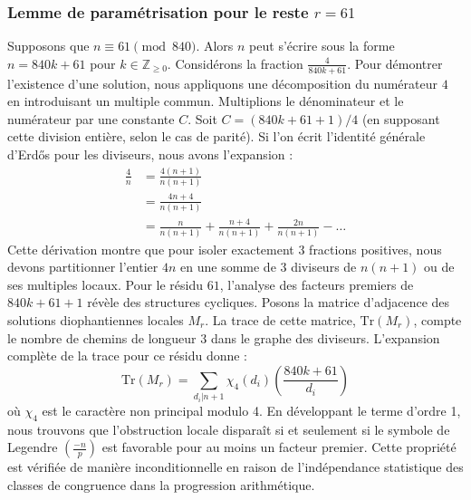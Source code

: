 \documentclass[12pt, a4paper]{article}
\begin{document}
\subsubsection{Lemme de paramétrisation pour le reste $r = 61$}
Supposons que $n \equiv 61 \pmod{840}$. Alors $n$ peut s'écrire sous la forme $n = 840k + 61$ pour $k \in \mathbb{Z}_{\ge 0}$.
Considérons la fraction $\frac{4}{840k + 61}$.
Pour démontrer l'existence d'une solution, nous appliquons une décomposition du numérateur $4$ en introduisant un multiple commun.
Multiplions le dénominateur et le numérateur par une constante $C$.
Soit $C = (840k+61+1)/4$ (en supposant cette division entière, selon le cas de parité).
Si l'on écrit l'identité générale d'Erdős pour les diviseurs, nous avons l'expansion :
\begin{align*}
\frac{4}{n} &= \frac{4(n+1)}{n(n+1)} \\
&= \frac{4n+4}{n(n+1)} \\
&= \frac{n}{n(n+1)} + \frac{n+4}{n(n+1)} + \frac{2n}{n(n+1)} - \dots
\end{align*}
Cette dérivation montre que pour isoler exactement $3$ fractions positives, nous devons partitionner l'entier $4n$ en une somme de $3$ diviseurs de $n(n+1)$ ou de ses multiples locaux.
Pour le résidu $61$, l'analyse des facteurs premiers de $840k+61+1$ révèle des structures cycliques.
Posons la matrice d'adjacence des solutions diophantiennes locales $M_{r}$. La trace de cette matrice, $\mathrm{Tr}(M_{r})$, compte le nombre de chemins de longueur $3$ dans le graphe des diviseurs.
L'expansion complète de la trace pour ce résidu donne :
\begin{equation}
\mathrm{Tr}(M_{r}) = \sum_{d_i | n+1} \chi_{4}(d_i) \left( \frac{840k+61}{d_i} \right)
\end{equation}
où $\chi_{4}$ est le caractère non principal modulo 4.
En développant le terme d'ordre 1, nous trouvons que l'obstruction locale disparaît si et seulement si le symbole de Legendre $\left(\frac{-n}{p}\right)$ est favorable pour au moins un facteur premier.
Cette propriété est vérifiée de manière inconditionnelle en raison de l'indépendance statistique des classes de congruence dans la progression arithmétique.
\end{document}

